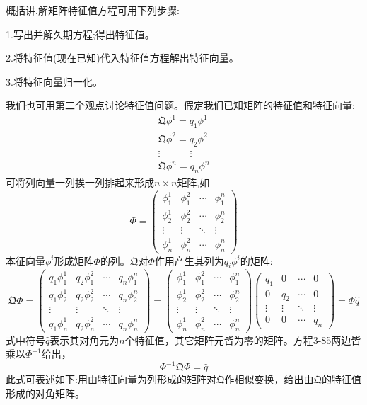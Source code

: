 概括讲,解矩阵特征值方程可用下列步骤:

1.写出并解久期方程;得出特征值。

2.将特征值(现在已知)代入特征值方程解出特征向量。

3.将特征向量归一化。

我们也可用第二个观点讨论特征值问题。假定我们已知矩阵的特征值和特征向量:
\[
\begin{array}{c}
    \mathfrak{Q}\phi^1=q_1\phi^1 \\
    \mathfrak{Q}\phi^2=q_2\phi^2 \\
    \vdots \quad \qquad \vdots \\
    \mathfrak{Q}\phi^n=q_n\phi^n 
\end{array}    
\tag{3-83}
\]
可将列向量一列挨一列排起来形成$n \times n$矩阵,如
\[
\Phi=
\begin{pmatrix}
    \phi^1_1 & \phi^2_1 & \cdots & \phi^n_1 \\
    \phi^1_2 & \phi^2_2 & \cdots & \phi^n_2 \\
    \vdots & \vdots & \ddots & \vdots \\
    \phi^1_n & \phi^2_n & \cdots & \phi^n_n 
\end{pmatrix}    
\tag{3-84}
\]
本征向量$\phi^i$形成矩阵$\Phi$的列。$\mathfrak{Q}$对$\Phi$作用产生其列为$q_i\phi^i$的矩阵:
\[
\mathfrak{Q}\Phi=
\begin{pmatrix}
    q_1\phi^1_1 & q_2\phi^2_1 & \cdots & q_n\phi^n_1 \\
    q_1\phi^1_2 & q_2\phi^2_2 & \cdots & q_n\phi^n_2 \\
    \vdots & \vdots & \ddots & \vdots \\
    q_1\phi^1_n & q_2\phi^2_n & \cdots & q_n\phi^n_n 
\end{pmatrix}  
=
\begin{pmatrix}
    \phi^1_1 & \phi^2_1 & \cdots & \phi^n_1 \\
    \phi^1_2 & \phi^2_2 & \cdots & \phi^n_2 \\
    \vdots & \vdots & \ddots & \vdots \\
    \phi^1_n & \phi^2_n & \cdots & \phi^n_n 
\end{pmatrix}
\begin{pmatrix}
    q_1 & 0 & \cdots & 0 \\
    0 & q_2 & \cdots & 0 \\
    \vdots & \vdots & \ddots & \vdots \\
    0 & 0 & \cdots & q_n
\end{pmatrix}
=\Phi \hat{q}
\tag{3-85}
\]
式中符号$\hat{q}$表示其对角元为$n$个特征值，其它矩阵元皆为零的矩阵。方程3-85两边皆乘以$\Phi^{-1}$给出，
\[\Phi^{-1}\mathfrak{Q}\Phi=\hat{q} \tag{3-86}\]
此式可表述如下:用由特征向量为列形成的矩阵对$\mathfrak{Q}$作相似变换，给出由$\mathfrak{Q}$的特征值形成的对角矩阵。


